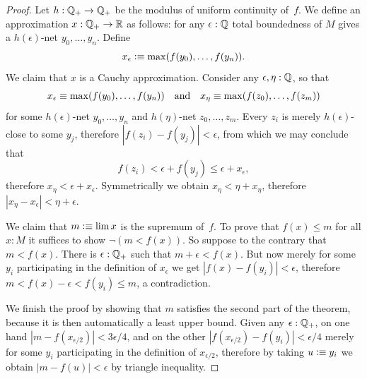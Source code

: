 \begin{proof}
  Let $h : \mathbb{Q}_{+} \to \mathbb{Q}_{+}$ be the modulus of uniform continuity of~$f$.
  We define an approximation $x : \mathbb{Q}_{+} \to \mathbb{R}$ as follows: for any $\epsilon : \mathbb{Q}$ total
  boundedness of $M$ gives a $h(\epsilon)$-net $y_0, \ldots, y_n$. Define
  \begin{equation*}
    x_\epsilon \vcentcolon\equiv \max (f(y_0), \ldots, f(y_n)).
  \end{equation*}
  We claim that $x$ is a Cauchy approximation. Consider any $\epsilon, \eta : \mathbb{Q}$, so that
  \begin{equation*}
    x_\epsilon \equiv \max (f(y_0), \ldots, f(y_n))
    \quad\text{and}\quad
    x_\eta \equiv \max (f(z_0), \ldots, f(z_m))
  \end{equation*}
  for some $h(\epsilon)$-net $y_0, \ldots, y_n$ and $h(\eta)$-net $z_0, \ldots, z_m$.
  Every $z_i$ is merely $h(\epsilon)$-close to some $y_j$, therefore $|f(z_i) - f(y_j)| <
  \epsilon$, from which we may conclude that
  \begin{equation*}
    f(z_i) < \epsilon + f(y_j) \leq \epsilon + x_\epsilon,
  \end{equation*}
  therefore $x_\eta < \epsilon + x_\epsilon$. Symmetrically we obtain $x_\eta < \eta +
  x_\eta$, therefore $|x_\eta - x_\epsilon| < \eta + \epsilon$.

  We claim that $m \vcentcolon\equiv \lim x$ is the supremum of~$f$. To prove that $f(x) \leq m$ for
  all $x : M$ it suffices to show $\lnot (m < f(x))$. So suppose to the contrary that $m <
  f(x)$. There is $\epsilon : \mathbb{Q}_{+}$ such that $m + \epsilon < f(x)$. But now merely for
  some $y_i$ participating in the definition of $x_\epsilon$ we get $|f(x) - f(y_i)| <
  \epsilon$, therefore $m < f(x) - \epsilon < f(y_i) \leq m$, a contradiction.

  We finish the proof by showing that $m$ satisfies the second part of the theorem, because
  it is then automatically a least upper bound. Given any $\epsilon : \mathbb{Q}_{+}$, on one hand
  $|m - f(x_{\epsilon/2})| < 3 \epsilon/4$, and on the other $|f(x_{\epsilon/2}) - f(y_i)| <
  \epsilon/4$ merely for some $y_i$ participating in the definition of $x_{\epsilon/2}$,
  therefore by taking $u \vcentcolon\equiv y_i$ we obtain $|m - f(u)| < \epsilon$ by triangle
  inequality.
\end{proof}

